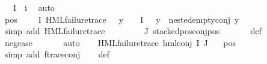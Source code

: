 \begin{isabellebody}
\ {\isacartoucheopen}{\isasymPhi}\ {\isacharbackquote}{\kern0pt}\ I\ {\isacharequal}{\kern0pt}\ {\isacharbraceleft}{\kern0pt}i{\isacharbraceright}{\kern0pt}{\isacartoucheclose}\ \isamarkupfalse%
\ auto\isanewline
\ \ \isamarkupfalse%
\ pos{\isacharcolon}{\kern0pt}\ {\isachardoublequoteopen}{\isacharparenleft}{\kern0pt}{\isasymexists}{\isasympsi}\ {\isasymin}\ {\isacharparenleft}{\kern0pt}{\isasymPsi}\ {\isacharbackquote}{\kern0pt}\ I{\isacharparenright}{\kern0pt}{\isachardot}{\kern0pt}\ {\isacharparenleft}{\kern0pt}HML{\isacharunderscore}{\kern0pt}failure{\isacharunderscore}{\kern0pt}trace\ {\isasympsi}{\isacharparenright}{\kern0pt}\ {\isasymand}\ {\isacharparenleft}{\kern0pt}{\isasymforall}y\ {\isasymin}\ {\isacharparenleft}{\kern0pt}{\isasymPsi}\ {\isacharbackquote}{\kern0pt}\ I{\isacharparenright}{\kern0pt}{\isachardot}{\kern0pt}\ {\isasympsi}\ {\isasymnoteq}\ y\ {\isasymlongrightarrow}\ nested{\isacharunderscore}{\kern0pt}empty{\isacharunderscore}{\kern0pt}conj\ y{\isacharparenright}{\kern0pt}{\isacharparenright}{\kern0pt}{\isachardoublequoteclose}\isanewline
\ \ \ \ \isamarkupfalse%
\ {\isacharparenleft}{\kern0pt}simp\ add{\isacharcolon}{\kern0pt}\ {\isacartoucheopen}HML{\isacharunderscore}{\kern0pt}failure{\isacharunderscore}{\kern0pt}trace\ {\isasympsi}{\isacartoucheclose}{\isacharparenright}{\kern0pt}\isanewline
\ \ \isamarkupfalse%
\ {\isachardoublequoteopen}{\isasymforall}{\isasympsi}\ {\isasymin}\ {\isasymPsi}\ {\isacharbackquote}{\kern0pt}\ J{\isachardot}{\kern0pt}\ stacked{\isacharunderscore}{\kern0pt}pos{\isacharunderscore}{\kern0pt}conj{\isacharunderscore}{\kern0pt}pos\ {\isasympsi}{\isachardoublequoteclose}\isanewline
\ \ \ \ \isamarkupfalse%
\ {\isasymPsi}{\isacharunderscore}{\kern0pt}def\isanewline
\ \ \ \ \isamarkupfalse%
\ neg{\isacharunderscore}{\kern0pt}case\ {}\isanewline
\ \ \ \ \isamarkupfalse%
\ auto\isanewline
\ \ \isamarkupfalse%
\ {\isachardoublequoteopen}HML{\isacharunderscore}{\kern0pt}failure{\isacharunderscore}{\kern0pt}trace\ {\isacharparenleft}{\kern0pt}hml{\isacharunderscore}{\kern0pt}conj\ I\ J\ {\isasymPsi}{\isacharparenright}{\kern0pt}{\isachardoublequoteclose}\ \isamarkupfalse%
\ pos\ \isanewline
\ \ \ \ \isamarkupfalse%
\ {\isacharparenleft}{\kern0pt}simp\ add{\isacharcolon}{\kern0pt}\ f{\isacharunderscore}{\kern0pt}trace{\isacharunderscore}{\kern0pt}conj{\isacharparenright}{\kern0pt}\isanewline
\ \ \isamarkupfalse%
\ {\isasymPsi}{\isacharunderscore}{\kern0pt}def\ \isamarkupfalse%

\end{isabellebody}
